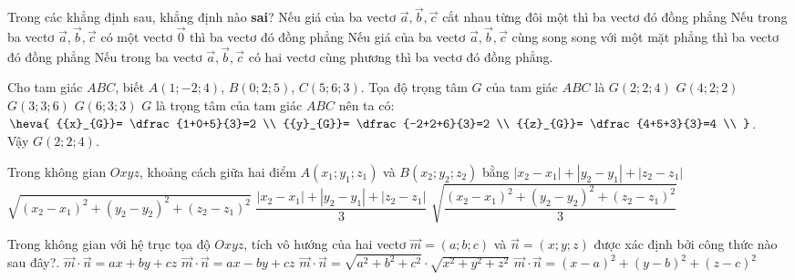 \begin{ex}%
	Trong các khẳng định sau, khẳng định nào \textbf{sai}?
	\choice
	{\True Nếu giá của ba vectơ $\overrightarrow{a},\overrightarrow{b},\overrightarrow{c}$ cắt nhau từng đôi một thì ba vectơ đó đồng phẳng}
	{Nếu trong ba vectơ $\overrightarrow{a},\overrightarrow{b},\overrightarrow{c}$ có một vectơ $\overrightarrow{0}$ thì ba vectơ đó đồng phẳng}
	{Nếu giá của ba vectơ $\overrightarrow{a},\overrightarrow{b},\overrightarrow{c}$ cùng song song với một mặt phẳng thì ba vectơ đó đồng phẳng}
	{Nếu trong ba vectơ $\overrightarrow{a},\overrightarrow{b},\overrightarrow{c}$ có hai vectơ cùng phương thì ba vectơ đó đồng phẳng.
	}
	 \end{ex}

\begin{ex}%
	Cho tam giác $ABC$, biết $A (1;-2;4 )$, $B (0;2;5 )$, $C (5;6;3 )$. Tọa độ trọng tâm $G$ của tam giác $ABC$ là
	\choice
	{\True $G (2;2;4 )$}
	{$G (4;2;2 )$}
	{$G (3;3;6 )$}
	{$G (6;3;3 )$}
	\loigiai
	{
	$G$ là trọng tâm của tam giác $ABC$ nên ta có:
	$\heva{
		{{x}_{G}}= \dfrac{1+0+5}{3}=2  \\
		{{y}_{G}}= \dfrac{-2+2+6}{3}=2  \\
		{{z}_{G}}= \dfrac{4+5+3}{3}=4  \\
		}$.\\
	Vậy $G (2;2;4 )$.
	}
\end{ex}

\begin{ex}%
	Trong không gian $Oxyz$, khoảng cách giữa hai điểm $A(x_1; y_1; z_1)$ và $B(x_2; y_2; z_2)$ bằng
	\choice
	{$|x_2-x_1|+|y_2-y_1|+|z_2-z_1|$}
	{\True  $\sqrt{(x_2-x_1)^2+(y_2-y_2)^2+(z_2-z_1)^2}$}
	{$\dfrac{|x_2-x_1|+|y_2-y_1|+|z_2-z_1|}{3}$}
	{$\sqrt{\dfrac{(x_2-x_1)^2+(y_2-y_2)^2+(z_2-z_1)^2}{3}}$}
\end{ex}

\begin{ex}%
	Trong không gian với hệ trục tọa độ $Oxyz$, tích vô hướng của hai vectơ $\overrightarrow{m}=(a;b;c)$ và $\overrightarrow{n}=(x;y;z)$ được xác định bởi công thức nào sau đây?.
	\choice
	{\True $\overrightarrow{m}\cdot \overrightarrow{n}=ax+by+cz$}
	{$\overrightarrow{m}\cdot \overrightarrow{n}=ax-by+cz$}
	{$\overrightarrow{m}\cdot \overrightarrow{n}=\sqrt{a^2+b^2+c^2}\cdot \sqrt{x^2+y^2+z^2}$}
	{$\overrightarrow{m}\cdot \overrightarrow{n}={{(x-a)}^2}+{{(y-b)}^2}+{{(z-c)}^2}$}
\end{ex}

